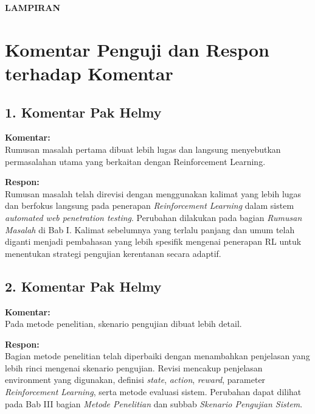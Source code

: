 \thispagestyle{empty}
\null
\vspace*{\fill}
\begin{center}
    {\LARGE \textbf{LAMPIRAN}}
\end{center}
\vspace*{\fill}
\clearpage
\pagestyle{plain}

\chapter{Komentar Penguji dan Respon terhadap Komentar}

\section*{1. Komentar Pak Helmy}
\textbf{Komentar:} \\
Rumusan masalah pertama dibuat lebih lugas dan langsung menyebutkan permasalahan utama yang berkaitan dengan Reinforcement Learning.

\textbf{Respon:} \\
Rumusan masalah telah direvisi dengan menggunakan kalimat yang lebih lugas dan berfokus langsung pada penerapan \textit{Reinforcement Learning} dalam sistem \textit{automated web penetration testing}. Perubahan dilakukan pada bagian \textit{Rumusan Masalah} di Bab I. Kalimat sebelumnya yang terlalu panjang dan umum telah diganti menjadi pembahasan yang lebih spesifik mengenai penerapan RL untuk menentukan strategi pengujian kerentanan secara adaptif.

\vspace{0.5cm}

\section*{2. Komentar Pak Helmy}
\textbf{Komentar:} \\
Pada metode penelitian, skenario pengujian dibuat lebih detail.

\textbf{Respon:} \\
Bagian metode penelitian telah diperbaiki dengan menambahkan penjelasan yang lebih rinci mengenai skenario pengujian. Revisi mencakup penjelasan environment yang digunakan, definisi \textit{state}, \textit{action}, \textit{reward}, parameter \textit{Reinforcement Learning}, serta metode evaluasi sistem. Perubahan dapat dilihat pada Bab III bagian \textit{Metode Penelitian} dan subbab \textit{Skenario Pengujian Sistem}.


